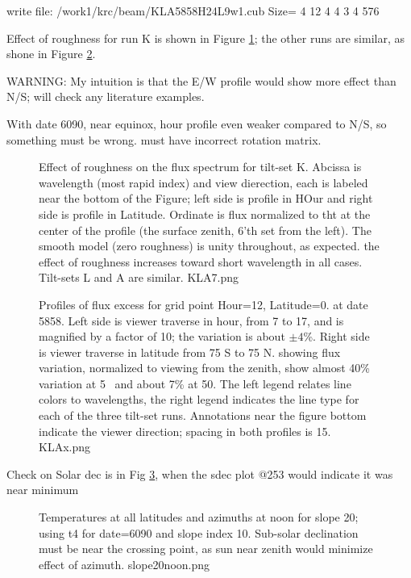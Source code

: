\documentclass{article}
\begin{document}
write  file: /work1/krc/beam/KLA5858H24L9w1.cub Size=  4 12 4 4 3 4 576

Effect of roughness for run K is shown in Figure \ref{KLA7}; the other runs are
similar, as shone in Figure \ref{KLAx}.

WARNING: My intuition is that the E/W profile would show more effect than N/S;
will check any literature examples.

With date 6090, near equinox, hour profile even weaker compared to N/S,
 so something must be wrong. must have incorrect rotation matrix.

\begin{figure}[!ht] 
\caption[Effect of roughness]{Effect of roughness on the flux spectrum for
  tilt-set K. Abcissa is wavelength (most rapid index) and view dierection, each
  is labeled near the bottom of the Figure; left side is profile in HOur and
  right side is profile in Latitude. Ordinate is flux normalized to tht at the
  center of the profile (the surface zenith, 6'th set from the left). The smooth
  model (zero roughness) is unity throughout, as expected. the effect of
  roughness increases toward short wavelength in all cases. Tilt-sets L and A
  are similar.
\label{KLA7} KLA7.png  }
\end{figure} 

\begin{figure}[!ht] 
\caption[Flux profiles]{Profiles of flux excess for grid point Hour=12,
  Latitude=0. at date 5858. Left side is viewer traverse in hour, from 7 to 17,
  and is magnified by a factor of 10; the variation is about $\pm 4$\%.  Right
  side is viewer traverse in latitude from 75 S to 75 N. showing flux variation,
  normalized to viewing from the zenith, show almost 40\% variation at 5\um~ and
  about 7\% at 50\um. The left legend relates line colors to wavelengths, the
  right legend indicates the line type for each of the three tilt-set
  runs. Annotations near the figure bottom indicate the viewer direction;
  spacing in both profiles is 15\qd.
\label{KLAx}  KLAx.png  }
\end{figure} 

Check on Solar dec is in Fig \ref{slope20noon}, when the sdec plot @253 would indicate it was near minimum

\begin{figure}[!ht] 
\caption[Slope 20 at noon]{Temperatures at all latitudes and azimuths at noon for
  slope 20\qd; using t4 for date=6090 and slope index 10. Sub-solar declination
  must be near the crossing point, as sun near zenith would minimize effect of
  azimuth.
\label{slope20noon}  slope20noon.png  }
\end{figure} 
\end{document}
